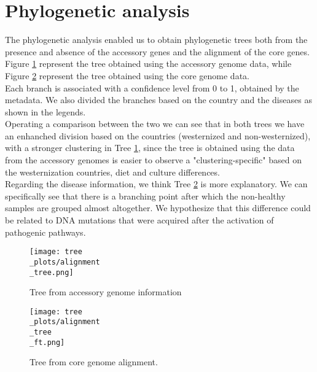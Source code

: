 \documentclass[a4paper,titlepage, oneside]{book}
\begin{document}
\section{Phylogenetic analysis }
The phylogenetic analysis enabled us to obtain phylogenetic trees both from the presence and absence of the accessory genes and the alignment of the core genes.
Figure \ref{fig:Tree1} represent the tree obtained using the accessory genome data, while Figure \ref{fig:Tree2} represent the tree obtained using the core genome data.\\Each branch is associated with a confidence level from 0 to 1, obtained by the metadata. We also divided the branches based on the country and the diseases as shown in the legends.
\\Operating a comparison between the two we can see that in both trees we have an enhanched division based on the countries (westernized and non-westernized), with a stronger clustering in Tree \ref{fig:Tree1}, since the tree is obtained using the data from the accessory genomes is easier to observe a "clustering-specific" based on the westernization countries, diet and culture differences.
\\Regarding the disease information, we think Tree \ref{fig:Tree2} is more explanatory. We can specifically see that there is a branching point after which the non-healthy samples are grouped almost altogether. We hypothesize that this difference could be related to DNA mutations that were acquired after the activation of pathogenic pathways.

\begin{figure}[ht]
\centering
\texttt{[image: tree\\\_plots/alignment\\\_tree.png]}
\caption{Tree from accessory genome information}
\label{fig:Tree1}
\end{figure}


\begin{figure}[ht]
\centering
\texttt{[image: tree\\\_plots/alignment\\\_tree\\\_ft.png]}
\caption{Tree from core genome alignment.}
\label{fig:Tree2}
\end{figure}
\end{document}
